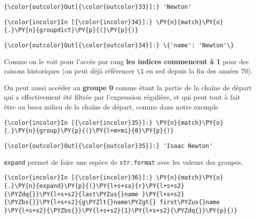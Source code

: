 \begin{Verbatim}[commandchars=\\\{\},frame=single,framerule=0.3mm,rulecolor=\color{cellframecolor}]
{\color{outcolor}Out[{\color{outcolor}33}]:} 'Newton'
\end{Verbatim}
            
    \begin{Verbatim}[commandchars=\\\{\},frame=single,framerule=0.3mm,rulecolor=\color{cellframecolor}]
{\color{incolor}In [{\color{incolor}34}]:} \PY{n}{match}\PY{o}{.}\PY{n}{groupdict}\PY{p}{(}\PY{p}{)}
\end{Verbatim}


\begin{Verbatim}[commandchars=\\\{\},frame=single,framerule=0.3mm,rulecolor=\color{cellframecolor}]
{\color{outcolor}Out[{\color{outcolor}34}]:} \{'name': 'Newton'\}
\end{Verbatim}
            
    Comme on le voit pour l'accès par rang \textbf{les indices commencent à
1} pour des raisons historiques (on peut déjà référencer
\texttt{\textbackslash{}1} en sed depuis la fin des années 70).

On peut aussi accéder au \textbf{groupe 0} comme étant la partie de la
chaîne de départ qui a effectivement été filtrée par l'expression
régulière, et qui peut tout à fait être au beau milieu de la chaîne de
départ, comme dans notre exemple

    \begin{Verbatim}[commandchars=\\\{\},frame=single,framerule=0.3mm,rulecolor=\color{cellframecolor}]
{\color{incolor}In [{\color{incolor}35}]:} \PY{n}{match}\PY{o}{.}\PY{n}{group}\PY{p}{(}\PY{l+m+mi}{0}\PY{p}{)}
\end{Verbatim}


\begin{Verbatim}[commandchars=\\\{\},frame=single,framerule=0.3mm,rulecolor=\color{cellframecolor}]
{\color{outcolor}Out[{\color{outcolor}35}]:} 'Isaac Newton'
\end{Verbatim}
            
    \texttt{expand} permet de faire une espèce de \texttt{str.format} avec
les valeurs des groupes.

    \begin{Verbatim}[commandchars=\\\{\},frame=single,framerule=0.3mm,rulecolor=\color{cellframecolor}]
{\color{incolor}In [{\color{incolor}36}]:} \PY{n}{match}\PY{o}{.}\PY{n}{expand}\PY{p}{(}\PY{l+s+sa}{r}\PY{l+s+s2}{\PYZdq{}}\PY{l+s+s2}{last\PYZus{}name }\PY{l+s+s2}{\PYZbs{}}\PY{l+s+s2}{g\PYZlt{}name\PYZgt{} first\PYZus{}name }\PY{l+s+s2}{\PYZbs{}}\PY{l+s+s2}{1}\PY{l+s+s2}{\PYZdq{}}\PY{p}{)}
\end{Verbatim}


